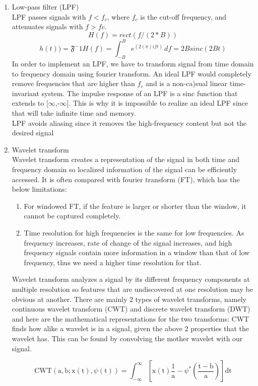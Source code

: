 \begin{enumerate}
	\item Low-pass filter (LPF)\\
	LPF passes signals with \(f<f_{c}\), where \(f_{c}\) is the cut-off frequency, and attenuates
	signals with \(f>fc\). 
	\[H(f) = rect(f/(2*B))\]
	\[h(t))= \mathfrak{F}^-1{H(f)} = \int_{-B}^{B} e^(2(\pi)ift)\,df = 2Bsinc(2Bt)\]
	In order to implement an LPF, we have to transform signal from time domain to 
	frequency domain using fourier transform. An ideal LPF would completely remove frequencies that are
	higher than \(f_{c}\) and is a non-ca)sual linear time-invariant system. The impulse
	response of an LPF is a sinc function that extends to [$\infty$,-$\infty$]. This is why it is impossible to 
	realize an ideal LPF since that will take infinite time and memory.\\
	LPF avoids aliasing since it removes the high-frequency content but not the desired signal

	\item Wavelet transform\\
	Wavelet transform creates a representation of the signal in both time and frequency domain so localized 
	information of the signal can be efficiently accessed. It is often compared with fourier transform (FT), which
	has the below limitations: 
	\begin{enumerate}
		\item For windowed FT, if the feature is larger or shorter than the window, it cannot be captured completely.
		\item Time resolution for high frequencies is the same for low frequencies. As frequency increases, rate of 
		change of the signal increases, and high frequency signals contain more information in a window than that of 
		low frequency, thus we need a higher time resolution for that.
	\end{enumerate}
	Wavelet transform analyzes a signal by its different frequency components at multiple resolution so features that are 
	undiscovered at one resolution may be obvious at another. There are mainly 2 types of wavelet transforms, namely 
	continuous wavelet transform (CWT) and discrete wavelet transform (DWT) and here are the mathematical representations
	for the two transforms:
	CWT finds how alike a wavelet is in a signal, given the above 2 properties that the wavelet has. \cite{wavelet}
	This can be found by convolving the mother wavelet with our signal.

	\begin{equation*} 
		\text{CWT}(\mathrm{a},\mathrm{b}; \mathrm{x}(\mathrm{t}),\psi(\mathrm{t}))=\int_{-\infty}^{\infty}[\mathrm{x}(\mathrm{t})\frac{1}{\mathrm{a}}-\psi^{*}(\frac{\mathrm{t}-\mathrm{b}}{\mathrm{a}})]\text{dt}
	\end{equation*}\cite{wavelet_denoise}


\end{enumerate}
